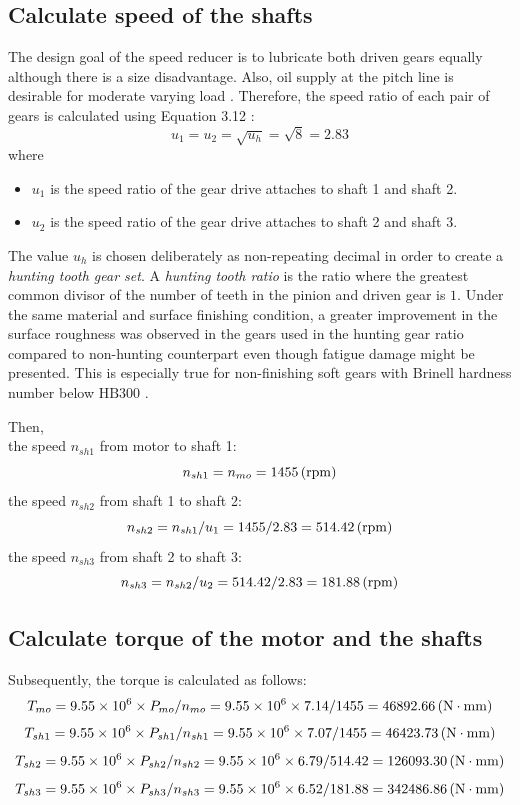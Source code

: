 \subsection{Calculate speed of the shafts} The design goal of the speed reducer is to lubricate both driven gears equally although there is a size disadvantage. Also, oil supply at the pitch line is desirable for moderate varying load \cite{mott_vavrek_wang_2018}. Therefore, the speed ratio of each pair of gears  is calculated using Equation 3.12 \cite{tk1}:
\[u_1=u_2=\sqrt{u_h}=\sqrt{8}=2.83\]
where
\begin{itemize}
	\item $ u_1 $ is the speed ratio of the gear drive attaches to shaft 1 and shaft 2.
	\item $ u_2 $ is the speed ratio of the gear drive attaches to shaft 2 and shaft 3.
\end{itemize}

The value $ u_h $ is chosen deliberately as non-repeating decimal in order to create a \textit{hunting tooth gear set}. A \textit{hunting tooth ratio} is the ratio where the greatest common divisor of the number of teeth in the pinion and driven gear is $ 1 $. Under the same material and surface finishing condition, a greater improvement in the surface roughness was observed in the gears used in the hunting gear ratio compared to non-hunting counterpart even though fatigue damage might be presented. This is especially true for non-finishing soft gears with Brinell hardness number below $ \text{HB}300 $  \cite{Ishibashi1981}.

Then,\\
the speed $ n_{sh1} $ from motor to shaft 1: \[ n_{sh1} = n_{mo} = 1455 \, (\mathrm{rpm})\]
the speed $ n_{sh2} $ from shaft 1 to shaft 2: \[ n_{sh2} = {n_{sh1}}/{u_1} = 1455/2.83 = 514.42 \, (\mathrm{rpm})\]
the speed $ n_{sh3} $ from shaft 2 to shaft 3: \[ n_{sh3} = {n_{sh2}}/{u_2} = 514.42/2.83 = 181.88 \, (\mathrm{rpm})\]

\subsection{Calculate torque of the motor and the shafts}
Subsequently, the torque is calculated as follows:\\
\[ T_{mo}  = 9.55\times10^6 \times P_{mo}/n_{mo} = 9.55\times10^6 \times 7.14/1455 = 46892.66 \, (\mathrm{N\cdot mm})\]
\[ T_{sh1} = 9.55\times10^6 \times {P_{sh1}}/{n_{sh1}} = 9.55\times10^6 \times 7.07/1455 = 46423.73 \, (\mathrm{N\cdot mm})\]
\[ T_{sh2} = 9.55\times10^6 \times {P_{sh2}}/{n_{sh2}} = 9.55\times10^6 \times 6.79/514.42 = 126093.30 \, (\mathrm{N\cdot mm})\]
\[ T_{sh3} = 9.55\times10^6 \times {P_{sh3}}/{n_{sh3}} = 9.55\times10^6 \times 6.52/181.88 = 342486.86 \, (\mathrm{N\cdot mm})\]

